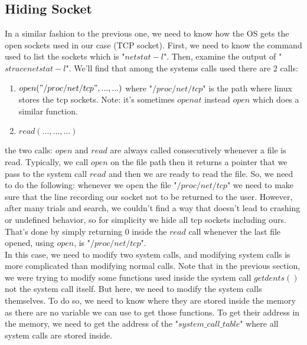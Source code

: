 \documentclass[12pt]{article}
\begin{document}
	 \subsection{Hiding Socket}
	 In a similar fashion to the previous one, we need to know how the OS gets the open sockets used in our case (TCP socket). First, we need to know the command used to list the sockets which is "$netstat -l$". Then, examine the output of "$strace netstat -l$". We'll find that among the systems calls used there are 2 calls: 
	 \begin{enumerate}
	 	\item $open("/proc/net/tcp",...,...)$ where "$/proc/net/tcp$" is the path where linux stores the tcp sockets. Note: it's sometimes $openat$ instead $open$ which does a similar function.
	 	\item $read(...,...,...)$
	 \end{enumerate}
 	 the two calls: $open$ and $read$ are always called consecutively whenever a file is read. Typically, we call $open$ on the file path then it returns a pointer that we pass to the system call $read$ and then we are ready to read the file. So, we need to do the following: whenever we open the file "$/proc/net/tcp$" we need to make sure that the line recording our socket not to be returned to the user. However, after many trials and search, we couldn't find a way that doesn't lead to crashing or undefined behavior, so for simplicity we hide all tcp sockets including ours. That's done by simply returning $0$ inside the $read$ call whenever the last file opened, using $open$, is "$/proc/net/tcp$".\\
	 In this case, we need to modify two system calls, and modifying system calls is more complicated than modifying normal calls. Note that in the previous section, we were trying to modify some functions used inside the system call $getdents()$ not the system call itself. But here, we need to modify the system calls themselves. To do so, we need to know where they are stored inside the memory as there are no variable we can use to get those functions. To get their address in the memory, we need to get the address of the "$system\_call\_table$" where all system calls are stored inside.
\end{document}
